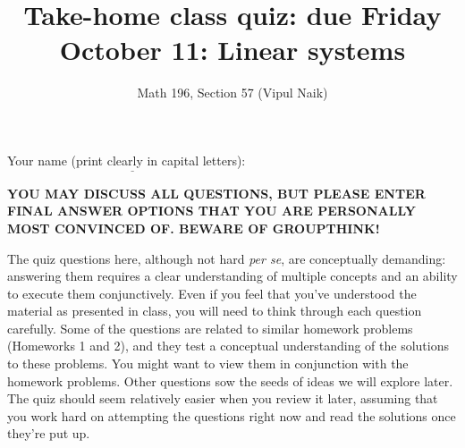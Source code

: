 \documentclass[10pt]{amsart}
\title{Take-home class quiz: due Friday October 11: Linear systems}
\author{Math 196, Section 57 (Vipul Naik)}
\begin{document}
\maketitle

Your name (print clearly in capital letters): $\underline{\qquad\qquad\qquad\qquad\qquad\qquad\qquad\qquad\qquad\qquad}$

{\bf YOU MAY DISCUSS ALL QUESTIONS, BUT PLEASE ENTER FINAL ANSWER
  OPTIONS THAT YOU ARE PERSONALLY MOST CONVINCED OF. BEWARE OF GROUPTHINK!}

The quiz questions here, although not hard {\em per se}, are
conceptually demanding: answering them requires a clear
understanding of multiple concepts and an ability to execute them
conjunctively. Even if you feel that you've understood the material as
presented in class, you will need to think through each question
carefully. Some of the questions are related to similar homework
problems (Homeworks 1 and 2), and they test a conceptual understanding
of the solutions to these problems. You might want to view them in
conjunction with the homework problems. Other questions sow the seeds
of ideas we will explore later. The quiz should seem relatively easier
when you review it later, assuming that you work hard on attempting
the questions right now and read the solutions once they're put up.
\end{document}
